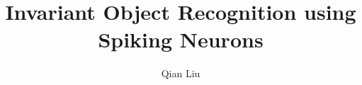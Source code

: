 \documentclass[12pt,PhD,twoside]{muthesis}
\begin{document}

\title{Invariant Object Recognition using Spiking Neurons}
\author{Qian Liu}

\beforeabstract












%



%

\end{document}
